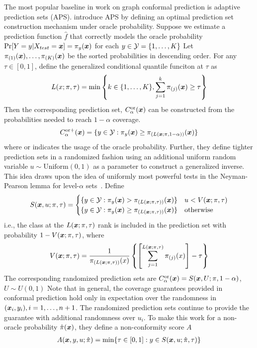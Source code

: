 The most popular baseline in work on graph conformal prediction is adaptive prediction sets (APS). 
\citet{romano2020classification} introduce APS by defining an optimal prediction set construction mechanism under oracle probability.
Suppose we estimate a prediction function $\hat{f}$ that correctly models the oracle probability $\Pr[Y=y|X_{test}={\bm{x}}] = \pi_y({\bm{x}})$ for each $y \in {\mathcal{Y}} = \{1, \dots, K\}$ 
Let $\pi_{(1)}({\bm{x}}), \dots, \pi_{(K)}({\bm{x}})$ be the sorted probabilities in descending order.
For any $\tau \in [0, 1]$, define the generalized conditional quantile funciton at $\tau$ as
\begin{align}
    L(x; \pi, \tau) =  \min\left\{ k \in \{1, \dots, K\}, \sum\limits_{j=1}^k \pi_{(j)}({\bm{x}}) \geq \tau \right\}
    \label{eq:APS:L}
\end{align}
Then the corresponding prediction set, $C_\alpha^{\text{or}}({\bm{x}})$ can be constructed from the probabilities needed to reach $1-\alpha$ coverage.
\[
    C_\alpha^{\text{or+}}({\bm{x}}) = \{y \in {\mathcal{Y}}: \pi_y({\bm{x}}) \geq \pi_{(L({\bm{x}}; \pi, 1-\alpha))}({\bm{x}})\}
\]
where $\text{or}$ indicates the usage of the oracle probability.
Further, they define tighter prediction sets in a randomized fashion using an additional uniform random variable $u \sim \text{Uniform}(0, 1)$ as a parameter to construct a generalized inverse. 
This idea draws upon the idea of uniformly most powerful tests in the Neyman-Pearson lemma for level-$\alpha$ sets~\cite{neyman1933ix}.
Define
\begin{align}
    S({\bm{x}}, u; \pi, \tau) = \begin{cases}
        \{y \in {\mathcal{Y}}: \pi_y({\bm{x}}) > \pi_{(L({\bm{x}}; \pi, \tau))}({\bm{x}})\} & u < V({\bm{x}}; \pi, \tau) \\
        \{y \in {\mathcal{Y}}: \pi_y({\bm{x}}) \geq \pi_{(L({\bm{x}}; \pi, \tau))}({\bm{x}})\} & \text{otherwise}
    \end{cases}
    \label{eq:APS:S}    
\end{align}
i.e., the class at the $L({\bm{x}}; \pi, \tau)$ rank is included in the prediction set with probability $1 - V({\bm{x}}; \pi, \tau)$, where
\[
V({\bm{x}}; \pi, \tau) = \frac{1}{\pi_{(L({\bm{x}}; \pi, \tau))}(x)} \left\{ \left[\sum\limits_{j=1}^{L({\bm{x}}; \pi, \tau)}{\pi_{(j)}(x)} \right] - \tau \right\}
\]
The corresponding randomized prediction sets are $C_\alpha^{\text{or}}({\bm{x}}) = S({\bm{x}}, U; \pi, 1 - \alpha)$, $U \sim U(0, 1)$
Note that in general, the coverage guarantees provided in conformal prediction hold only in expectation over the randomness in $({\bm{x}}_i, y_i), i = 1, \dots, n+1$.
The randomized prediction sets continue to provide the guarantee with additional randomness over $u_i$.
To make this work for a non-oracle probability $\hat{\pi}({\bm{x}})$, they define a non-conformity score $A$
\begin{align}
    A({\bm{x}}, y, u;\hat{\pi}) = \min\{\tau \in [0, 1]: y \in S({\bm{x}}, u; \hat{\pi}, \tau)\}
    \label{eq:APS:score}
\end{align}

